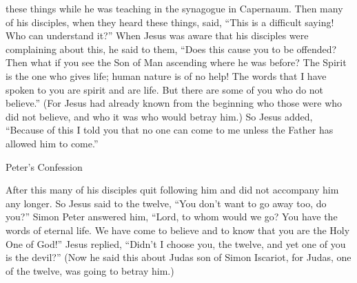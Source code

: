 {these things
while
he was teaching
in
the synagogue
in
Capernaum.
Then
many
of
his
disciples,
when
they heard
these things, said,
“This is
a
difficult
saying! Who
can
understand
it?”
When
Jesus
was aware
that
his
disciples
were complaining
about
this,
he said
to them,
“Does
this
cause
you
to be offended?
Then
what if
you see
the Son
of Man
ascending
where
he was
before?
The Spirit
is
the one who gives life;
human nature
is
of no
help! The words
that
I
have spoken
to you
are
spirit
and
are
life.
But
there are
some
of
you
who
do
not
believe.”
(For
Jesus
had already known
from
the beginning
who
those were
who did
not
believe,
and
who
it was
who would betray
him.)
So
Jesus added, “Because of
this
I told
you
that
no one
can
come
to
me
unless
the Father
has allowed
him to come.”
\par }{\SH Peter’s Confession
\par }{\PP {}After
this
many
of his
disciples
quit
following
him and
did
not
accompany
him
any longer.
So
Jesus
said
to the twelve,
“You
don’t
want
to go away
too,
do you?”
Simon
Peter
answered
him,
“Lord,
to
whom
would we go? You have
the words
of
eternal
life.
We
have come to believe
and
to know
that
you
are
the Holy
One of God!”
Jesus
replied, “Didn’t
I
choose
you,
the twelve,
and
yet one
of
you
is
the devil?”
(Now he said
this about Judas
son of Simon
Iscariot,
for
Judas,
one
of the twelve,
was going
to betray
him.)

}
